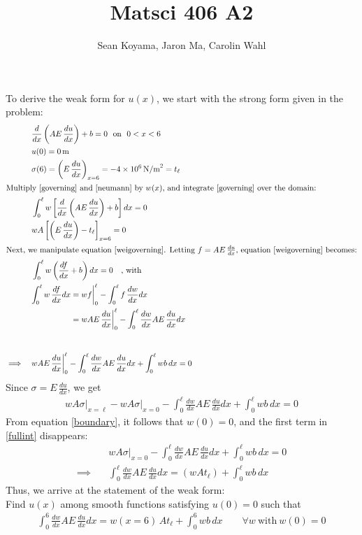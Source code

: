 \documentclass[12pt]{article}
\title{Matsci 406 A2}
\author{Sean Koyama, Jaron Ma, Carolin Wahl}
\begin{document}
\maketitle

\section{}
To derive the weak form for $u(x)$, we start with the strong form given in the problem:
\begin{align}
	&\frac{d}{dx}\left(AE\,\frac{du}{dx}\right)+b=0~~\text{on}~~0<x<6\label{governing}\\ 
	&u(0)=0\,\text{m}\label{boundary}\\
	&\sigma(6)=\left(E\,\frac{du}{dx}\right)_{x=6}=-4\times10^{6}\,\text{N/m}^{2}=t_\ell\label{neumann}\\
\intertext{Multiply \eqref{governing} and \eqref{neumann} by $w(x)$, and integrate \eqref{governing} over the domain:}
	&\int_{0}^{\ell}w\left[\frac{d}{dx}\left(AE\,\frac{du}{dx}\right)+b\right]dx=0\label{weigoverning}\\
	&wA\left[\left(E\,\frac{du}{dx}\right)-t_\ell\right]_{x=6}=0\label{weineumann}\\
\intertext{Next, we manipulate equation \eqref{weigoverning}. Letting $f=AE\,\frac{du}{dx}$, equation \eqref{weigoverning} becomes:}
	&\int_{0}^{\ell}w\left(\frac{df}{dx}+b\right)dx=0\quad\text{, with}\\
	&\begin{aligned}\int_{0}^{\ell}w\,\frac{df}{dx}dx&=wf\biggr\vert_0^\ell-\int_{0}^{\ell}f\,\frac{dw}{dx}dx\\
	&=wAE\,\frac{du}{dx}\biggr\vert_0^\ell-\int_{0}^{\ell}\frac{dw}{dx}AE\,\frac{du}{dx}dx\end{aligned}\\[24pt]
	\implies\quad&wAE\,\frac{du}{dx}\biggr\vert_0^\ell-\int_{0}^{\ell}\frac{dw}{dx}AE\,\frac{du}{dx}dx+\int_{0}^{\ell}wb\,dx=0
\end{align}
Since $\sigma=E\,\frac{du}{dx}$, we get
\begin{align}
	wA\sigma\vert_{x=\ell}-wA\sigma\vert_{x=0}-\int_{0}^{\ell}\frac{dw}{dx}AE\,\frac{du}{dx}dx+\int_{0}^{\ell}wb\,dx=0\label{fullint}
\end{align}
From equation \eqref{boundary}, it follows that $w(0)=0$, and the first term in \eqref{fullint} disappears:
\begin{align}
	&wA\sigma\vert_{x=0}-\int_{0}^{\ell}\frac{dw}{dx}AE\,\frac{du}{dx}dx+\int_{0}^{\ell}wb\,dx=0\\
	\implies\quad&\int_{0}^{\ell}\frac{dw}{dx}AE\,\frac{du}{dx}dx=\left(wAt_\ell\right)+\int_{0}^{\ell}wb\,dx
\end{align}
Thus, we arrive at the statement of the weak form:\\[12pt]
Find $u(x)$ among smooth functions satisfying $u(0)=0$ such that 
\begin{align}
	\int_{0}^{6}\frac{dw}{dx}AE\,\frac{du}{dx}dx=w(x\!=\!6)\,At_\ell+\int_{0}^{6}wb\,dx\qquad\forall w~\text{with}~w(0)=0
\end{align}
\newpage
\end{document}
